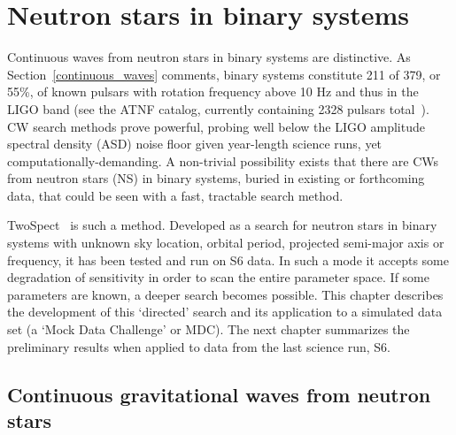 


        
        \section{Neutron stars in binary systems}
        \label{binary_NS}

Continuous waves from neutron stars in binary systems are distinctive.
As Section~\ref{continuous_waves} comments, binary systems constitute 211 of 379, or 55\%, of known pulsars with rotation frequency above 10 Hz and thus in the LIGO band (see the ATNF catalog, currently containing 2328 pulsars total~\cite{ManchesterATNF2005}).
CW search methods prove powerful, probing well below the LIGO amplitude spectral density (ASD) noise floor given year-length science runs, yet computationally-demanding.
A non-trivial possibility exists that there are CWs from neutron stars (NS) in binary systems, buried in existing or forthcoming data, that could be seen with a fast, tractable search method.

TwoSpect~\cite{GoetzThesis,GoetzTwoSpectMethods2011,GoetzTwoSpectResults2014} is such a method. 
Developed as a search for neutron stars in binary systems with unknown sky location, orbital period, projected semi-major axis or frequency, it has been tested and run on S6 data.
In such a mode it accepts some degradation of sensitivity in order to scan the entire parameter space.
If some parameters are known, a deeper search becomes possible.
This chapter describes the development of this `directed' search and its application to a simulated data set (a `Mock Data Challenge' or MDC).
The next chapter summarizes the preliminary results when applied to data from the last science run, S6.


\subsection{Continuous gravitational waves from neutron stars}

